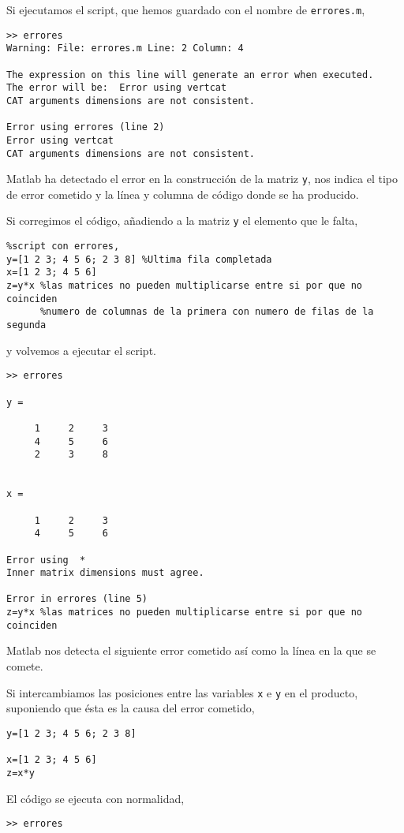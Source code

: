 \begin{enumerate}
Si ejecutamos el script, que hemos guardado con el nombre de \texttt{errores.m},

\begin{verbatim}
>> errores
Warning: File: errores.m Line: 2 Column: 4

The expression on this line will generate an error when executed.  
The error will be:  Error using vertcat
CAT arguments dimensions are not consistent.
 
Error using errores (line 2)
Error using vertcat
CAT arguments dimensions are not consistent.
\end{verbatim}

Matlab ha detectado el error en la construcción de la matriz \texttt{y}, nos indica el tipo de error cometido y la línea y columna de código donde se ha producido.

Si corregimos el código, añadiendo a la matriz \texttt{y} el elemento que le falta,

\begin{verbatim}
%script con errores,
y=[1 2 3; 4 5 6; 2 3 8] %Ultima fila completada
x=[1 2 3; 4 5 6]
z=y*x %las matrices no pueden multiplicarse entre si por que no coinciden
      %numero de columnas de la primera con numero de filas de la segunda
\end{verbatim}
y volvemos a ejecutar el script.
\begin{verbatim}
>> errores

y =

     1     2     3
     4     5     6
     2     3     8


x =

     1     2     3
     4     5     6

Error using  * 
Inner matrix dimensions must agree.

Error in errores (line 5)
z=y*x %las matrices no pueden multiplicarse entre si por que no coinciden
\end{verbatim}
Matlab nos detecta el siguiente error cometido así como la línea en la que se comete. 

Si intercambiamos las posiciones entre las variables \texttt{x} e \texttt{y} en el producto, suponiendo que ésta es la causa del error cometido,

\begin{verbatim}
y=[1 2 3; 4 5 6; 2 3 8] 

x=[1 2 3; 4 5 6]
z=x*y 
\end{verbatim}

El código se ejecuta con normalidad,
\begin{verbatim}
>> errores


\end{verbatim}
\end{enumerate}
